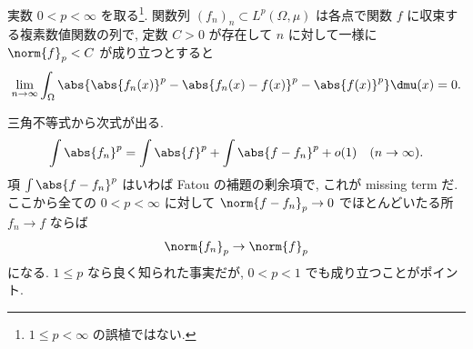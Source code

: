 \documentclass[openany, a4paper, oneside]{jsbook}
\begin{document}
\begin{prop}
実数 $0 < p < \infty$ を取る\footnote{$1 \leq p < \infty$ の誤植ではない. }.
関数列 $(f_n)_{n} \subset L^p (\Omega, \mu)$ は各点で関数 $f$ に収束する複素数値関数の列で,
定数 $C > 0$ が存在して $n$ に対して一様に $\norm{f}_p < C$ が成り立つとすると
\begin{align}
 \lim_{n \to \infty}
 \int_{\Omega} \abs{\abs{f_n(x)}^p - \abs{f_n(x) - f(x)}^p - \abs{f(x)}^p} \dmu (x)
 = 0.
\end{align}
\end{prop}
\begin{rem}
三角不等式から次式が出る.
\begin{align}
 \int \abs{f_n}^p
 =
 \int \abs{f}^p + \int \abs{f - f_n}^p + o (1) \quad (n \to \infty).
\end{align}
項 $\int \abs{f - f_n}^p$ はいわば Fatou の補題の剰余項で, これが missing term だ.
ここから全ての $0 < p < \infty$ に対して $\norm{f - f_n}_p \to 0$ でほとんどいたる所 $f_n \to f$ ならば
\begin{align}
 \norm{f_n}_p \to \norm{f}_p
\end{align}
になる.
$1 \leq p$ なら良く知られた事実だが, $0 < p < 1$ でも成り立つことがポイント.
\end{rem}
\end{document}
